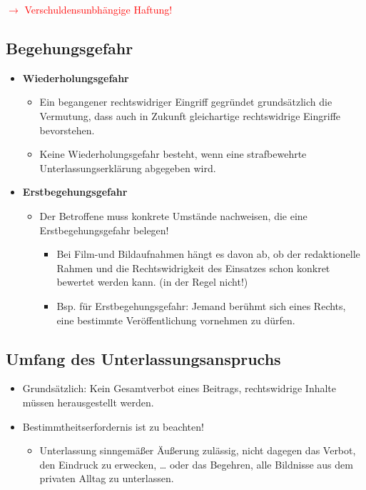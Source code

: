 \textcolor{red}{$\rightarrow$ Verschuldensunbhängige Haftung!}
%
%
%
\subsection{Begehungsgefahr}
\begin{itemize}
    \item \textbf{Wiederholungsgefahr} 
    \begin{itemize}
        \item Ein begangener rechtswidriger Eingriff gegründet grundsätzlich die Vermutung, dass auch in Zukunft gleichartige rechtswidrige Eingriffe bevorstehen. 
        \item Keine Wiederholungsgefahr besteht, wenn eine strafbewehrte Unterlassungserklärung abgegeben wird. 
    \end{itemize}
    \item \textbf{Erstbegehungsgefahr}
    \begin{itemize}
        \item Der Betroffene muss konkrete Umstände nachweisen, die eine Erstbegehungsgefahr belegen!
        \begin{itemize}
            \item Bei Film-und Bildaufnahmen hängt es davon ab, ob der redaktionelle Rahmen und die Rechtswidrigkeit des Einsatzes schon konkret bewertet werden kann. (in der Regel nicht!)
            \item Bsp. für Erstbegehungsgefahr: Jemand berühmt sich eines Rechts, eine bestimmte Veröffentlichung vornehmen zu dürfen.
        \end{itemize}
    \end{itemize}
\end{itemize}
%
%
%
\subsection{Umfang des Unterlassungsanspruchs}
\begin{itemize}
    \item Grundsätzlich: Kein Gesamtverbot eines Beitrags, rechtswidrige Inhalte müssen herausgestellt werden. 
    \item Bestimmtheitserfordernis ist zu beachten!
    \begin{itemize}
        \item Unterlassung \glqq{}sinngemäßer Äußerung\grqq{} zulässig, nicht dagegen das Verbot, \glqq{}den Eindruck zu erwecken, \dots\grqq{} oder das Begehren, alle Bildnisse \glqq{} aus dem privaten Alltag\grqq{} zu unterlassen.
    \end{itemize}
\end{itemize}
%
%
%
